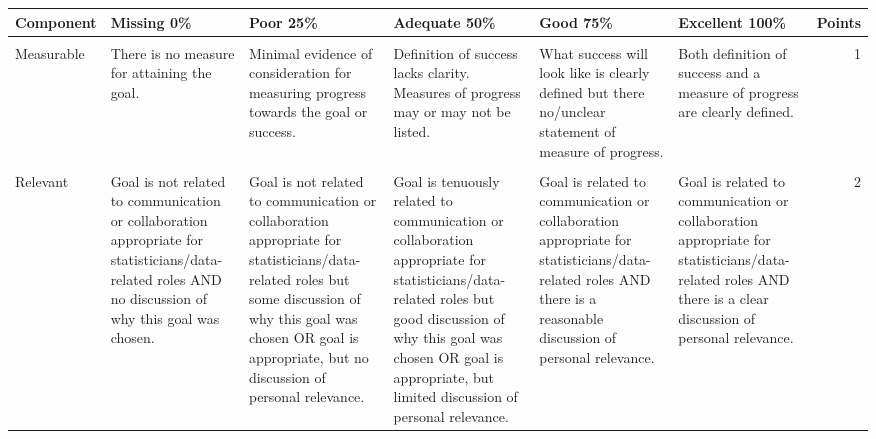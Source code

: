 \documentclass[
  openany]{book}
\begin{document}
\begin{table}
\centering\begingroup\fontsize{8}{10}\selectfont

\begin{tabular}{l>{\raggedright\arraybackslash}p{12em}>{\raggedright\arraybackslash}p{12em}>{\raggedright\arraybackslash}p{12em}>{\raggedright\arraybackslash}p{12em}>{\raggedright\arraybackslash}p{12em}r}
\toprule
Component & Missing 0\% & Poor 25\% & Adequate 50\% & Good 75\% & Excellent 100\% & Points\\
\midrule
\cellcolor{gray!6}{Specific} & \cellcolor{gray!6}{There is no goal stated.} & \cellcolor{gray!6}{Goal is too generic and poorly specified.} & \cellcolor{gray!6}{Goal is stated but it is not specific. At least one resource may or may not be listed.} & \cellcolor{gray!6}{Goal is specific but no/unclear resource is mentioned.} & \cellcolor{gray!6}{Goal is specific. At least one resource that will be used to help is mentioned.} & \cellcolor{gray!6}{1}\\
Measurable & There is no measure for attaining the goal. & Minimal evidence of consideration for measuring progress towards the goal or success. & Definition of success lacks clarity. Measures of progress may or may not be listed. & What success will look like is clearly defined but there no/unclear statement of measure of progress. & Both definition of success and a measure of progress are clearly defined. & 1\\
\cellcolor{gray!6}{Attainable} & \cellcolor{gray!6}{There is no explanation for how the goal is to be attained.} & \cellcolor{gray!6}{Inappropriate scope, not believable that the goal is attainable.} & \cellcolor{gray!6}{Some issues with the scope of the goal, may not be attainable. Understanding of the steps and potential problems very limited.} & \cellcolor{gray!6}{Goal has a mostly appropriate scope but may lack some clarity around steps to take and potential problems.} & \cellcolor{gray!6}{Goal has an appropriate scope, and a strong understanding of the steps to take and potential problems is shown.} & \cellcolor{gray!6}{1}\\
Relevant & Goal is not related to communication or collaboration appropriate for statisticians/data-related roles AND no discussion of why this goal was chosen. & Goal is not related to communication or collaboration appropriate for statisticians/data-related roles but some discussion of why this goal was chosen OR goal is appropriate, but no discussion of personal relevance. & Goal is tenuously related to communication or collaboration appropriate for statisticians/data-related roles but good discussion of why this goal was chosen OR goal is appropriate, but limited discussion of personal relevance. & Goal is related to communication or collaboration appropriate for statisticians/data-related roles AND there is a reasonable discussion of personal relevance. & Goal is related to communication or collaboration appropriate for statisticians/data-related roles AND there is a clear discussion of personal relevance. & 2\\

\end{tabular}
\end{table}
\end{document}
